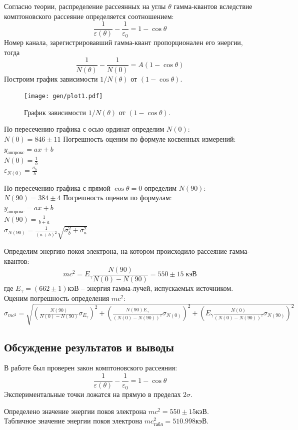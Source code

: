 \documentclass[10pt,a4paper]{article}
\begin{document}
	Согласно теории, распределение рассеянных на углы $\theta$ гамма-квантов вследствие комптоновского рассеяние определяется соотношением: 
	$$
	\frac{1}{\varepsilon(\theta)} - \frac{1}{\varepsilon_0} = 1 - \cos \theta
	$$
	Номер канала, зарегистрировавший гамма-квант пропорционален его энергии, тогда
	$$
	\frac{1}{N(\theta)} - \frac{1}{N(0)} = A (1 - \cos \theta)
	$$
	Построим график зависимости $1/N(\theta)$ от $(1 - \cos \theta)$.\\
	\begin{figure}
		\centering
		\texttt{[image: gen/plot1.pdf]}
		\caption{График зависимости $1/N(\theta)$ от $(1 - \cos \theta)$.}
	\end{figure}

	По пересечению графика с осью ординат определим $N(0)$:\\
	$N(0) = 846 \pm 11$
	Погрешность оценим по формуле косвенных измерений: \\
	$y_{аппрокс} = ax + b$\\
	$N(0) = \frac{1}{b}$\\
	$\varepsilon_{N(0)} = \frac{\sigma_b}{b}$
	
	По пересечению графика с прямой $\cos \theta = 0$ определим $N(90)$:\\
	$N(90) = 384 \pm 4$
	Погрешность оценим по формулам: \\
	$y_{аппрокс} = ax + b$\\
	$N(90) = \frac{1}{b + a}$ \\
	$\sigma_{N(90)} = \frac{1}{(a + b)^2}\sqrt{\sigma_b^2 + \sigma_a^2}$
	
	Определим энергию покоя электрона, на котором происходило рассеяние гамма-квантов: \\
	$$
	mc^2 = E_\gamma \frac{N(90)}{N(0) - N(90)} = 550 \pm 15 \; кэВ
	$$
	где $E_\gamma = (662\pm1) кэВ$ -- энергия гамма-лучей, испускаемых источником. Оценим погрешность определения $mc^2$:\\
	$\sigma_{mc^2} = \sqrt{(\frac{N(90)}{N(0) - N(90)} \sigma_{E_\gamma})^2 + (\frac{N(90) E_\gamma}{(N(0) - N(90))^2} \sigma_{N(0)})^2 + (E_\gamma \frac{N(0)}{(N(0) - N(90))^2}\sigma_{N(90)})^2}$
	
	\subsection*{Обсуждение результатов и выводы}
	
	В работе был проверен закон комптоновского рассеяния:
	$$
	\frac{1}{\varepsilon(\theta)} - \frac{1}{\varepsilon_0} = 1 - \cos \theta
	$$
	Экспериментальные точки ложатся на прямую в пределах $2\sigma$.
	
	Определено значение энергии покоя электрона $mc^2 = 550 \pm 15 кэВ$. \\
	Табличное значение энергии покоя электрона $mc^2_{табл} = 510.998 кэВ$.
	
\end{document}
